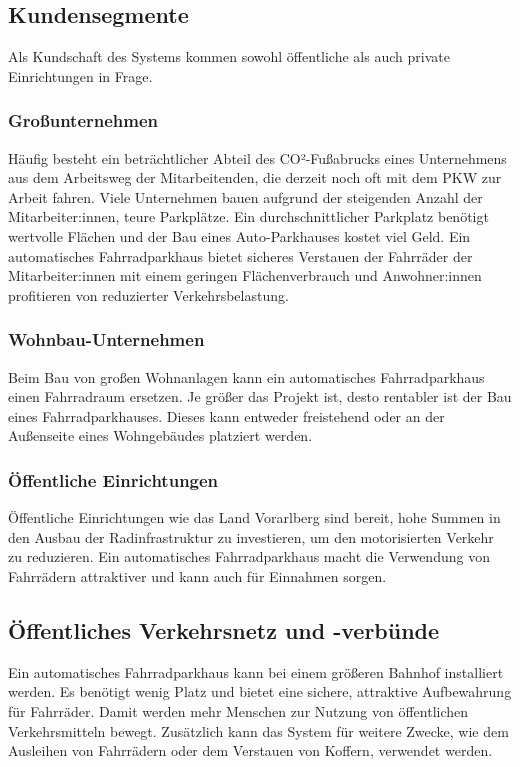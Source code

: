 \subsection{Kundensegmente}
Als Kundschaft des Systems kommen sowohl öffentliche als auch private Einrichtungen in Frage.

\subsubsection{Großunternehmen}
Häufig besteht ein beträchtlicher Abteil des CO²-Fußabrucks eines Unternehmens aus dem Arbeitsweg der Mitarbeitenden, die derzeit noch oft mit dem PKW zur Arbeit fahren. Viele Unternehmen bauen aufgrund der steigenden Anzahl der Mitarbeiter:innen, teure Parkplätze. Ein durchschnittlicher Parkplatz benötigt wertvolle Flächen und der Bau eines Auto-Parkhauses kostet viel Geld. Ein automatisches Fahrradparkhaus bietet sicheres Verstauen der Fahrräder der Mitarbeiter:innen mit einem geringen Flächenverbrauch und Anwohner:innen profitieren von reduzierter Verkehrsbelastung.

\subsubsection{Wohnbau-Unternehmen}
Beim Bau von großen Wohnanlagen kann ein automatisches Fahrradparkhaus einen Fahrradraum ersetzen. Je größer das Projekt ist, desto rentabler ist der Bau eines Fahrradparkhauses. Dieses kann entweder freistehend oder an der Außenseite eines Wohngebäudes platziert werden.

\subsubsection{Öffentliche Einrichtungen}
Öffentliche Einrichtungen wie das Land Vorarlberg sind bereit, hohe Summen in den Ausbau der Radinfrastruktur zu investieren, um den motorisierten Verkehr zu reduzieren. Ein automatisches Fahrradparkhaus macht die Verwendung von Fahrrädern attraktiver und kann auch für Einnahmen sorgen.

\subsection{Öffentliches Verkehrsnetz und -verbünde}
Ein automatisches Fahrradparkhaus kann bei einem größeren Bahnhof installiert werden. Es benötigt wenig Platz und bietet eine sichere, attraktive Aufbewahrung für Fahrräder. Damit werden mehr Menschen zur Nutzung von öffentlichen Verkehrsmitteln bewegt. Zusätzlich kann das System für weitere Zwecke, wie dem Ausleihen von Fahrrädern oder dem Verstauen von Koffern, verwendet werden.


